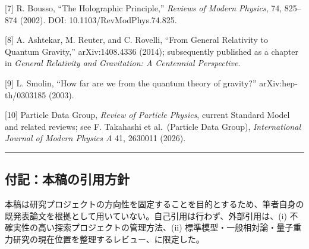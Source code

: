 \documentclass[
  a4paper,
]{ltjsarticle}
\begin{document}
{[}7{]} R. Bousso, ``The Holographic Principle,'' \emph{Reviews of
Modern Physics}, 74, 825--874 (2002). DOI: 10.1103/RevModPhys.74.825.

{[}8{]} A. Ashtekar, M. Reuter, and C. Rovelli, ``From General
Relativity to Quantum Gravity,'' arXiv:1408.4336 (2014); subsequently
published as a chapter in \emph{General Relativity and Gravitation: A
Centennial Perspective}.

{[}9{]} L. Smolin, ``How far are we from the quantum theory of
gravity?'' arXiv:hep-th/0303185 (2003).

{[}10{]} Particle Data Group, \emph{Review of Particle Physics}, current
Standard Model and related reviews; see F. Takahashi et al.~(Particle
Data Group), \emph{International Journal of Modern Physics A} 41,
2630011 (2026).

\begin{center}\rule{0.5\linewidth}{0.5pt}\end{center}

\subsection{付記：本稿の引用方針}\label{ux4ed8ux8a18ux672cux7a3fux306eux5f15ux7528ux65b9ux91dd}

本稿は研究プロジェクトの方向性を固定することを目的とするため、筆者自身の既発表論文を根拠として用いていない。自己引用は行わず、外部引用は、(i)
不確実性の高い探索プロジェクトの管理方法、(ii)
標準模型・一般相対論・量子重力研究の現在位置を整理するレビュー、に限定した。
\end{document}
